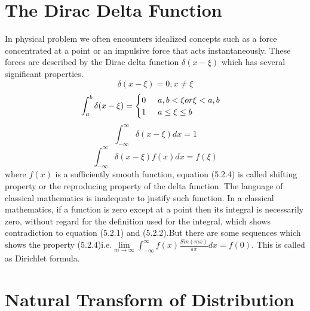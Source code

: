 \section{The Dirac Delta Function}
In physical problem we often encounters idealized concepts such as a force concentrated at a point or an impulsive force that acts instantaneously. These forces are described by the Dirac delta function $ \delta(x-\xi) $ which has several significant properties.
\begin{equation}
\delta(x-\xi)=0,x\neq \xi  
\end{equation}
\begin{align}
 \int_{a}^{b}\delta(x-\xi)= \begin{cases}
 0\hspace{0.5cm}  a,b<\xi or \xi <a,b \\
 1\hspace{0.5cm}  a\leq \xi \leq b
  \end{cases}
 \end{align}
 \begin{equation}
\int_{-\infty}^{\infty}\delta(x-\xi)dx=1
\end{equation}
  \begin{equation}
\int_{-\infty}^{\infty}\delta(x-\xi)f(x)dx=f(\xi)
\end{equation}
where $ f(x) $ is a sufficiently smooth function,  equation (5.2.4) is called shifting property or the reproducing property of the delta function. The language of classical mathematics is inadequate to justify such function. In a classical mathematics, if a function is zero except at a point then its integral is necessarily zero, without regard for the definition used for the integral, which shows contradiction to equation (5.2.1) and (5.2.2).But there are some sequences which shows the property (5.2.4)i.e.$ \underset{m \rightarrow \infty}\lim \int_{-\infty}^{\infty}f(x)\frac{Sin(mx)}{\pi x}dx=f(0) $. This is called as Dirichlet formula.
  
\section{Natural Transform of Distribution}

